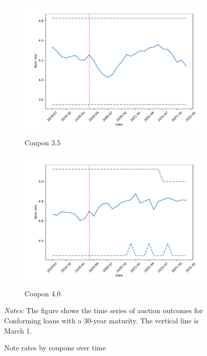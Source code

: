 \documentclass[11pt,a4paper]{article}
\begin{document}
\begin{figure}[h]
\begin{subfigure}[b]{0.49\textwidth}
          \includegraphics[width=0.998\textwidth]{../results/figures/NoteRate_mean_mat30_loan1_timeseries_nrmonthly_2.5_4_c35.0.pdf}
          \caption{ Coupon 3.5}
          \end{subfigure}
        \begin{subfigure}[b]{0.49\textwidth}
          \includegraphics[width=0.998\textwidth]{../results/figures/NoteRate_mean_mat30_loan1_timeseries_nrmonthly_2.5_4_c40.0.pdf}
          \caption{ Coupon 4.0}
          \end{subfigure}
   \caption{Note rates by coupons over time} 
   \begin{minipage}{\textwidth}
      \footnotesize{\textit{Notes:} The figure shows the time series of auction outcomes for Conforming loans with a 30-year maturity.  The vertical line is March 1.}
      \end{minipage}
\end{figure}
\end{document}
